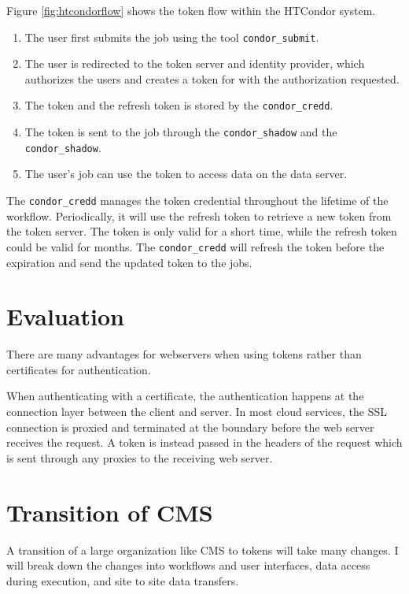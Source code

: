 \documentclass{webofc}
\begin{document}
\noindent
Figure \ref{fig:htcondorflow} shows the token flow within the HTCondor system.

\begin{enumerate}
    \item The user first submits the job using the tool \texttt{condor\_submit}.
    \item The user is redirected to the token server and identity provider, which authorizes the users and creates a token for with the authorization requested.
    \item The token and the refresh token is stored by the \texttt{condor\_credd}.  
    \item The token is sent to the job through the \texttt{condor\_shadow} and the \texttt{condor\_shadow}.
    \item The user's job can use the token to access data on the data server.
\end{enumerate}

The \texttt{condor\_credd} manages the token credential throughout the lifetime of the workflow.  Periodically, it will use the refresh token to retrieve a new token from the token server.  The token is only valid for a short time, while the refresh token could be valid for months.  The \texttt{condor\_credd} will refresh the token before the expiration and send the updated token to the jobs.



\section{Evaluation}
\label{sec:eval}

There are many advantages for webservers when using tokens rather than certificates for authentication.

When authenticating with a certificate, the authentication happens at the connection layer between the client and server.  In most cloud services, the SSL connection is proxied and terminated at the boundary before the web server receives the request.  A token is instead passed in the headers of the request which is sent through any proxies to the receiving web server.

\section{Transition of CMS}
\label{sec:transition}
A transition of a large organization like CMS to tokens will take many changes.  I will break down the changes into workflows and user interfaces, data access during execution, and site to site data transfers.
\end{document}
